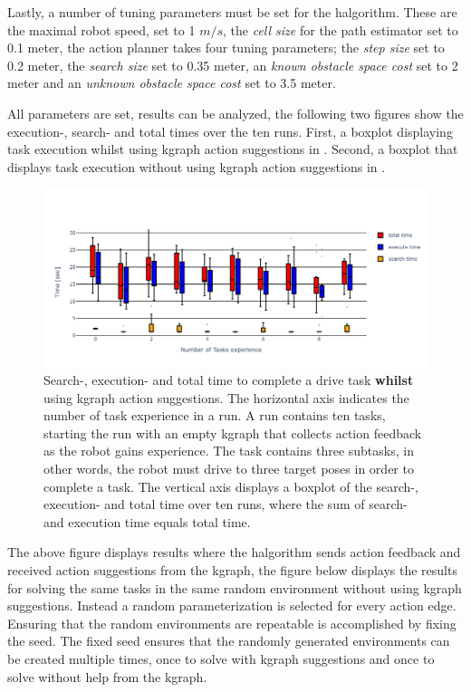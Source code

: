 Lastly, a number of tuning parameters must be set for the \ac{halgorithm}. These are the maximal robot speed, set to 1 $m/s$, the \textit{cell size} for the path estimator set to 0.1 meter, the action planner takes four tuning parameters; the \textit{step size} set to 0.2 meter, the \textit{search size} set to 0.35 meter, an \textit{known obstacle space cost} set to 2 meter and an \textit{unknown obstacle space cost} set to 3.5 meter.\bs

All parameters are set, results can be analyzed, the following two figures show the execution-, search- and total times over the ten runs. First, a boxplot displaying task execution whilst using \ac{kgraph} action suggestions in . Second, a boxplot that displays task execution without using \ac{kgraph} action suggestions in .\bs

\begin{figure}[H]
    \centering
    \includegraphics[width=\textwidth]{figures/results/random_drive_time_kgraph}
    \caption{Search-, execution- and total time to complete a drive task \textbf{whilst} using \ac{kgraph} action suggestions. The horizontal axis indicates the number of task experience in a run. A run contains ten tasks, starting the run with an empty \ac{kgraph} that collects action feedback as the robot gains experience. The task contains three subtasks, in other words, the robot must drive to three target poses in order to complete a task. The vertical axis displays a boxplot of the search-, execution- and total time over ten runs, where the sum of search- and execution time equals total time.}%
   \label{fig:random_drive_time_kgraph}
\end{figure}

The above figure displays results where the \ac{halgorithm} sends action feedback and received action suggestions from the \ac{kgraph}, the figure below displays the results for solving the same tasks in the same random environment without using \ac{kgraph} suggestions. Instead a random parameterization is selected for every action edge. Ensuring that the random environments are repeatable is accomplished by fixing the seed. The fixed seed ensures that the randomly generated environments can be created multiple times, once to solve with \ac{kgraph} suggestions and once to solve without help from the \ac{kgraph}.\bs

